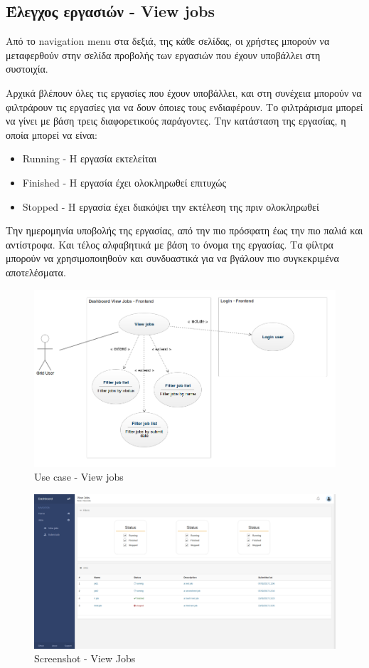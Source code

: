 \subsection{Έλεγχος εργασιών - View jobs}

Από το navigation menu στα δεξιά, της κάθε σελίδας, οι χρήστες μπορούν να μεταφερθούν στην σελίδα προβολής των εργασιών που έχουν υποβάλλει στη συστοιχία.

Αρχικά βλέπουν όλες τις εργασίες που έχουν υποβάλλει, και στη συνέχεια μπορούν να φιλτράρουν τις εργασίες για να δουν όποιες τους ενδιαφέρουν.
\newline
Το φιλτράρισμα μπορεί να γίνει με βάση τρεις διαφορετικούς παράγοντες. 
\newline
Την κατάσταση της εργασίας, η οποία μπορεί να είναι:
\begin{itemize}
\item Running - Η εργασία εκτελείται
\item Finished - Η εργασία έχει ολοκληρωθεί επιτυχώς
\item Stopped - Η εργασία έχει διακόψει την εκτέλεση της πριν ολοκληρωθεί
\end{itemize}
Την ημερομηνία υποβολής της εργασίας, από την πιο πρόσφατη έως την πιο παλιά και αντίστροφα.
\newline
Και τέλος αλφαβητικά με βάση το όνομα της εργασίας.
\newline
Τα φίλτρα μπορούν να χρησιμοποιηθούν και συνδυαστικά για να βγάλουν πιο συγκεκριμένα αποτελέσματα.

\begin{figure}[t]
\caption{Use case - View jobs}
\includegraphics[width=16cm]{../images/view-jobs-case.png}
\centering
\end{figure}
\clearpage

\begin{figure}[t]
\caption{Screenshot - View Jobs}
\includegraphics[width=16cm]{../images/view-jobs-screenshot.png}
\centering
\end{figure}
\clearpage







